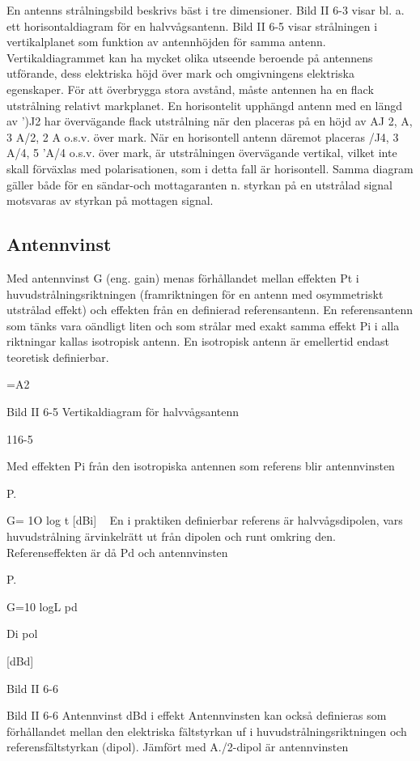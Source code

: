 En antenns strålningsbild beskrivs bäst i tre
dimensioner. Bild II 6-3 visar bl. a. ett horisontaldiagram för en halvvågsantenn.
Bild II 6-5 visar strålningen i vertikalplanet som funktion av antennhöjden för samma
antenn. Vertikaldiagrammet kan ha mycket
olika utseende beroende på antennens utförande, dess elektriska höjd över mark och
omgivningens elektriska egenskaper. För
att överbrygga stora avstånd, måste antennen ha en flack utstrålning relativt markplanet. En horisontelit upphängd antenn med
en längd av ')J2 har övervägande flack utstrålning när den placeras på en höjd av AJ
2, A, 3 A/2, 2 A o.s.v. över mark. När en
horisontell antenn däremot placeras /J4, 3
A/4, 5 'A/4 o.s.v. över mark, är utstrålningen
övervägande vertikal, vilket inte skall förväxlas med polarisationen, som i detta fall är
horisontell.
Samma diagram gäller både för en
sändar-och mottagaranten n. styrkan på en
utstrålad signal motsvaras av styrkan på
mottagen signal.

\subsection{Antennvinst}

Med antennvinst G (eng. gain) menas förhållandet mellan effekten Pt i huvudstrålningsriktningen (framriktningen för en antenn med osymmetriskt utstrålad effekt) och
effekten från en definierad referensantenn.
En referensantenn som tänks vara oändligt liten och som strålar med exakt samma
effekt Pi i alla riktningar kallas isotropisk
antenn.
En isotropisk antenn är emellertid endast
teoretisk definierbar.

=A2

Bild II 6-5 Vertikaldiagram för halvvågsantenn

116-5

Med effekten Pi från den isotropiska antennen som referens blir antennvinsten

P.

G= 1O log t
[dBi]
~
En i praktiken definierbar referens är
halvvågsdipolen, vars huvudstrålning ärvinkelrätt ut från dipolen och runt omkring den.
Referenseffekten är då Pd och antennvinsten

P.

G=10 logL
pd

Di pol

[dBd]

Bild II 6-6

Bild II 6-6 Antennvinst dBd i effekt
Antennvinsten kan också definieras som
förhållandet mellan den elektriska fältstyrkan
uf i huvudstrålningsriktningen och referensfältstyrkan
(dipol).
Jämfört med A./2-dipol är antennvinsten

